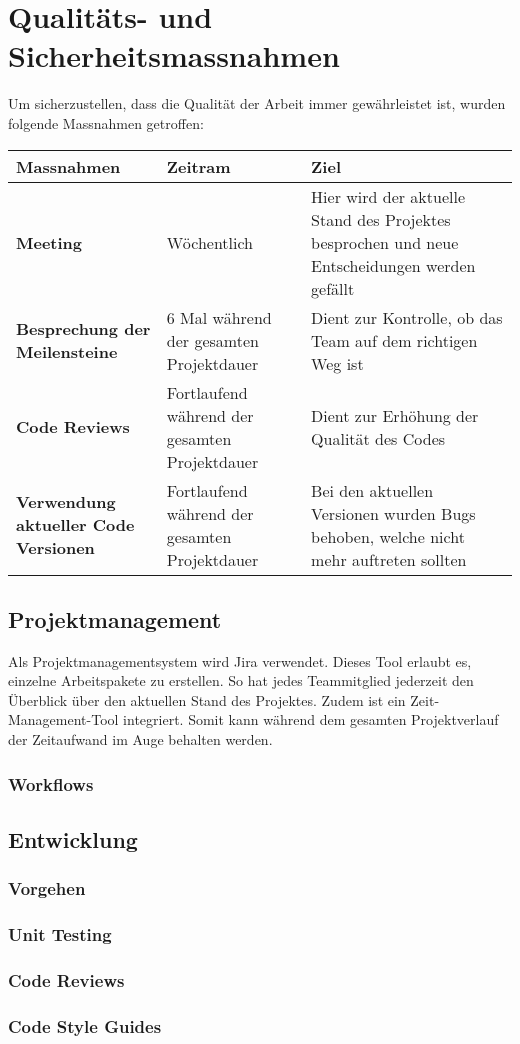 \section{Qualitäts- und Sicherheitsmassnahmen}
Um sicherzustellen, dass die Qualität der Arbeit immer gewährleistet ist, wurden folgende Massnahmen getroffen:

\begin{center}
	\begin{tabular}{| m{3.5cm} | m{3.5cm} | m{3.5cm} |}
	\hline
	\textbf{Massnahmen} & \textbf{Zeitram} & \textbf{Ziel} \\
	\hline
	\textbf{Meeting} & Wöchentlich & Hier wird der aktuelle Stand des Projektes besprochen und neue Entscheidungen werden gefällt \\
	\hline
	\textbf{Besprechung der Meilensteine} & 6 Mal während der gesamten Projektdauer & Dient zur Kontrolle, ob das Team auf dem richtigen Weg ist \\
	\hline
	\textbf{Code Reviews} & Fortlaufend während der gesamten Projektdauer & Dient zur Erhöhung der Qualität des Codes \\
	\hline
	\textbf{Verwendung aktueller Code Versionen} & Fortlaufend während der gesamten Projektdauer & Bei den aktuellen Versionen wurden Bugs behoben, welche nicht mehr auftreten sollten \\
	\hline
	\end{tabular}
\end{center}

\subsection{Projektmanagement}
Als Projektmanagementsystem wird Jira verwendet. Dieses Tool erlaubt es, einzelne Arbeitspakete zu erstellen. So hat jedes Teammitglied jederzeit den Überblick über den aktuellen Stand des Projektes. Zudem ist ein Zeit-Management-Tool integriert. Somit kann während dem gesamten Projektverlauf der Zeitaufwand im Auge behalten werden.

\subsubsection{Workflows}

\subsection{Entwicklung}

\subsubsection{Vorgehen}

\subsubsection{Unit Testing}

\subsubsection{Code Reviews}

\subsubsection{Code Style Guides}

\newpage